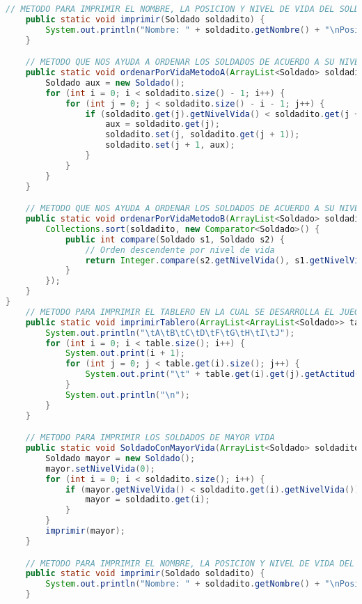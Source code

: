 \documentclass{article}
\begin{document}
\begin{itemize}
\begin{itemize}
\begin{lstlisting}[language=java]
    // METODO PARA IMPRIMIR EL NOMBRE, LA POSICION Y NIVEL DE VIDA DEL SOLDADO
    public static void imprimir(Soldado soldadito) {
        System.out.println("Nombre: " + soldadito.getNombre() + "\nPosicion: " + soldadito.getColumna() + "X" + soldadito.getFila() + "\tVida: " + soldadito.getNivelVida());
    }

    // METODO QUE NOS AYUDA A ORDENAR LOS SOLDADOS DE ACUERDO A SU NIVEL DE VIDA, USUANDO UN ALGORITMO DE ORDENAMIENTO DE BURBUJA
    public static void ordenarPorVidaMetodoA(ArrayList<Soldado> soldadito) {
        Soldado aux = new Soldado();
        for (int i = 0; i < soldadito.size() - 1; i++) {
            for (int j = 0; j < soldadito.size() - i - 1; j++) {
                if (soldadito.get(j).getNivelVida() < soldadito.get(j + 1).getNivelVida()) {
                    aux = soldadito.get(j);
                    soldadito.set(j, soldadito.get(j + 1));
                    soldadito.set(j + 1, aux);
                }
            }
        }
    }

    // METODO QUE NOS AYUDA A ORDENAR LOS SOLDADOS DE ACUERDO A SU NIVEL DE VIDA, EN ESTA OCACION DIFERENTE A LA ANTERIOR QUE ERA ALGORITMO DE BURBUJA
    public static void ordenarPorVidaMetodoB(ArrayList<Soldado> soldadito) {
        Collections.sort(soldadito, new Comparator<Soldado>() {
            public int compare(Soldado s1, Soldado s2) {
                // Orden descendente por nivel de vida
                return Integer.compare(s2.getNivelVida(), s1.getNivelVida());
            }
        });
    }
}
    // METODO PARA IMPRIMIR EL TABLERO EN LA CUAL SE DESARROLLA EL JUEGO
    public static void imprimirTablero(ArrayList<ArrayList<Soldado>> table) {
        System.out.println("\tA\tB\tC\tD\tF\tG\tH\tI\tJ");
        for (int i = 0; i < table.size(); i++) {
            System.out.print(i + 1);
            for (int j = 0; j < table.get(i).size(); j++) {
                System.out.print("\t" + table.get(i).get(j).getActitud());
            }
            System.out.println("\n");
        }
    }

    // METODO PARA IMPRIMIR LOS SOLDADOS DE MAYOR VIDA
    public static void SoldadoConMayorVida(ArrayList<Soldado> soldadito) {
        Soldado mayor = new Soldado();
        mayor.setNivelVida(0);
        for (int i = 0; i < soldadito.size(); i++) {
            if (mayor.getNivelVida() < soldadito.get(i).getNivelVida()) {
                mayor = soldadito.get(i);
            }
        }
        imprimir(mayor);
    }

    // METODO PARA IMPRIMIR EL NOMBRE, LA POSICION Y NIVEL DE VIDA DEL SOLDADO
    public static void imprimir(Soldado soldadito) {
        System.out.println("Nombre: " + soldadito.getNombre() + "\nPosicion: " + soldadito.getColumna() + "X" + soldadito.getFila() + "\tVida: " + soldadito.getNivelVida());
    }


\end{lstlisting}
\end{itemize}
\end{itemize}
\end{document}
